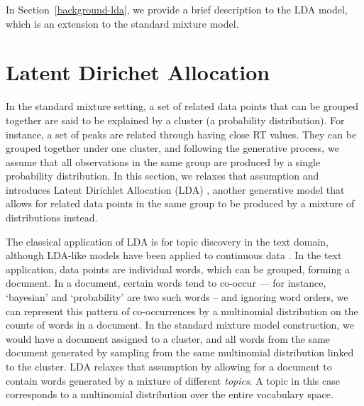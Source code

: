 In Section~\ref{background-lda}, we provide a brief description to the LDA model, which is an extension to the standard mixture model. 

\section{Latent Dirichet Allocation\label{background-lda}}

In the standard mixture setting, a set of related data points that can be grouped together are said to be explained by a cluster (a probability distribution). For instance, a set of peaks are related through having close RT values. They can be grouped together under one cluster, and following the generative process, we assume that all observations in the same group are produced by a single probability distribution. In this section, we relaxes that assumption and introduces Latent Dirichlet Allocation (LDA) \cite{Blei2003}, another generative model that allows for related data points in the same group to be produced by a mixture of distributions instead.

The classical application of LDA is for topic discovery in the text domain, although LDA-like models have been applied to continuous data \cite{rogers2005latent,weinshall2013lda,das2015gaussian}. In the text application, data points are individual words, which can be grouped, forming a document. In a document, certain words tend to co-occur --- for instance, `bayesian' and `probability' are two such words -- and ignoring word orders, we can represent this pattern of co-occurrences by a multinomial distribution on the counts of words in a document. In the standard mixture model construction, we would have a document assigned to a cluster, and all words from the same document generated by sampling from the same multinomial distribution linked to the cluster. LDA relaxes that assumption by allowing for a document to contain words generated by a mixture of different \emph{topics}. A topic in this case corresponds to a multinomial distribution over the entire vocabulary space.

